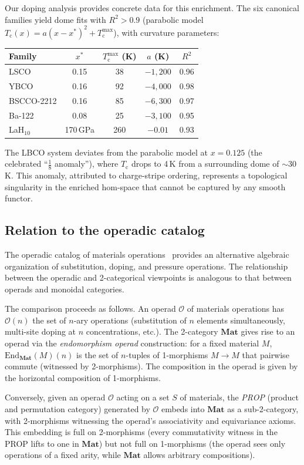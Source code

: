 \documentclass[12pt,a4paper]{article}
\theoremstyle{plain}
\theoremstyle{definition}
\theoremstyle{remark}
\newcommand{\Tc}{T_{\mathrm{c}}}
\newcommand{\Matl}{\mathbf{Mat}}
\begin{document}
Our doping analysis provides concrete data for this enrichment.  The
six canonical families yield dome fits with $R^2 > 0.9$ (parabolic
model $\Tc(x) = a(x - x^*)^2 + \Tc^{\max}$), with curvature
parameters:
\begin{center}
\begin{tabular}{@{}lcccc@{}}
\toprule
Family & $x^*$ & $\Tc^{\max}$ (K) & $a$ (K) & $R^2$ \\
\midrule
LSCO       & 0.15 &  38 & $-1{,}200$ & 0.96 \\
YBCO       & 0.16 &  92 & $-4{,}000$ & 0.98 \\
BSCCO-2212 & 0.16 &  85 & $-6{,}300$ & 0.97 \\
Ba-122     & 0.08 &  25 & $-3{,}100$ & 0.95 \\
LaH$_{10}$ & 170\,GPa & 260 & $-0.01$ & 0.93 \\
\bottomrule
\end{tabular}
\end{center}
The LBCO system deviates from the parabolic model at $x = 0.125$
(the celebrated ``$\frac{1}{8}$ anomaly''), where $\Tc$ drops to 4\,K
from a surrounding dome of $\sim$30\,K.  This anomaly, attributed to
charge-stripe ordering, represents a topological singularity in the
enriched hom-space that cannot be captured by any smooth functor.

\subsection{Relation to the operadic catalog}

The operadic catalog of materials operations~\cite{placeholder_operad}
provides an alternative algebraic organization of substitution, doping,
and pressure operations.  The relationship between the operadic and
2-categorical viewpoints is analogous to that between operads and monoidal
categories.

The comparison proceeds as follows.  An operad $\mathcal{O}$ of materials
operations has $\mathcal{O}(n)$ the set of $n$-ary operations (substitution
of $n$ elements simultaneously, multi-site doping at $n$ concentrations,
etc.).  The 2-category $\Matl$ gives rise to an operad via the
\emph{endomorphism operad} construction: for a fixed material $M$,
$\mathrm{End}_\Matl(M)(n)$ is the set of $n$-tuples of 1-morphisms
$M \to M$ that pairwise commute (witnessed by 2-morphisms).  The
composition in the operad is given by the horizontal composition of
1-morphisms.

Conversely, given an operad $\mathcal{O}$ acting on a set $S$ of materials,
the \emph{PROP} (product and permutation category) generated by
$\mathcal{O}$ embeds into $\Matl$ as a sub-2-category, with 2-morphisms
witnessing the operad's associativity and equivariance axioms.  This
embedding is full on 2-morphisms (every commutativity witness in the PROP
lifts to one in $\Matl$) but not full on 1-morphisms (the operad sees
only operations of a fixed arity, while $\Matl$ allows arbitrary
compositions).
\end{document}
